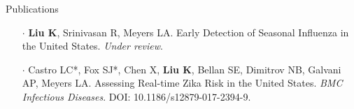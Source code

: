 \documentclass{my_resume} %
\begin{document}

\begin{rSection}{Publications}
  \begin{itemize}
    \setlength\itemsep{-1.6em}
    \setlength\leftskip{-1.2em}
    \item[$\cdot$] {\bf Liu K}, Srinivasan R, Meyers LA. Early Detection of
      Seasonal Influenza in the United States. {\em Under review}.\\
    \item[$\cdot$] Castro LC*, Fox SJ*, Chen X, {\bf Liu K}, Bellan SE, Dimitrov NB, Galvani AP,
    Meyers LA. Assessing Real-time Zika Risk in the United States. {\em BMC
    Infectious Diseases}. DOI: 10.1186/s12879-017-2394-9.
  \end{itemize}
\end{rSection}

\end{document}
